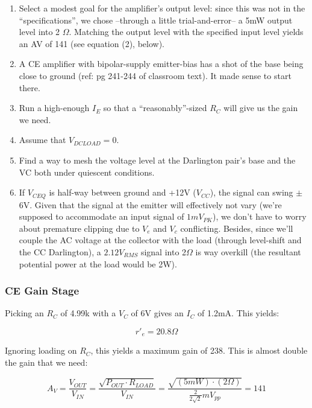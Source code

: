 \documentclass[journal]{IEEEtran}
\begin{document}
\begin{enumerate}
\item
Select a modest goal for the amplifier’s output level: since this was not in the
“specifications”, we chose --through a little trial-and-error-- a 5mW output level
into 2 $\Omega$. Matching the output level with the specified input level yields an AV of
141 (see equation (2), below).
\item
A CE amplifier with bipolar-supply emitter-bias has a shot of the base being close
to ground (ref: pg 241-244 of classroom text). It made sense to start there.
\item
Run a high-enough $I_{E}$ so that a “reasonably”-sized $R_{C}$ will give us the gain we
need.
\item
Assume that $V_{DCLOAD} = 0$.
\item
Find a way to mesh the voltage level at the Darlington pair’s base and the VC both
under quiescent conditions.
\item
If $V_{CEQ}$ is half-way between ground and +12V ($V_{CC}$), the signal can swing $\pm$ 6V.
Given that the signal at the emitter will effectively not vary (we’re supposed to
accommodate an input signal of $1mV_{PK}$), we don’t have to worry about premature
clipping due to $V_{e}$ and $V_{c}$ conflicting. Besides, since we’ll couple the AC voltage
at the collector with the load (through level-shift and the CC Darlington), a
$2.12 V_{RMS}$ signal into 2$\Omega$ is way overkill (the resultant potential power at the load
would be 2W).
\end{enumerate}

\subsubsection{CE Gain Stage}

Picking an $R_{C}$ of 4.99k with a $V_{C}$ of 6V gives an $I_{C}$ of 1.2mA. This yields:

\begin{equation}
r'_{e} = 20.8\Omega
\end{equation}

Ignoring loading on $R_{C}$, this yields a maximum gain of 238. This is almost double the gain that we
need:

\begin{equation}
A_{V} = \frac{V_{OUT}}{V_{IN}} = \frac{\sqrt{P_{OUT}\cdot R_{LOAD}}}{V_{IN}} = \frac{\sqrt{\left(5mW\right)\cdot \left(2\Omega\right)}}{\frac{2}{2\sqrt{2}}mV_{pp}} = 141
\end{equation}
\end{document}
